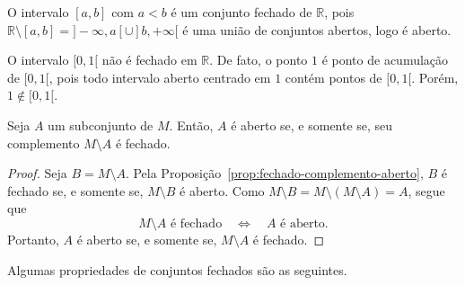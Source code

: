 \begin{example}
    O intervalo $[a, b]$ com $a<b$ é um conjunto fechado de $\mathbb R$, pois $\mathbb R\setminus [a, b] = ]-\infty, a[ \cup ]b, +\infty[$ é uma união de conjuntos abertos, logo é aberto.
\end{example}

\begin{example}
    O intervalo $[0,1[$ não é fechado em $\mathbb R$.
    De fato, o ponto $1$ é ponto de acumulação de $[0,1[$, pois todo intervalo aberto centrado em $1$ contém pontos de $[0,1[$.
    Porém, $1\notin [0,1[$.
\end{example}

\begin{corollary}
    Seja $A$ um subconjunto de $M$.
    Então, $A$ é aberto se, e somente se, seu complemento $M\setminus A$ é fechado.
\end{corollary}
\begin{proof}
    Seja $B=M\setminus A$.
    Pela Proposição~\ref{prop:fechado-complemento-aberto}, $B$ é fechado se, e somente se, $M\setminus B$ é aberto.
    Como $M\setminus B=M\setminus(M\setminus A)=A$, segue que
    \[
        M\setminus A \text{ é fechado}
        \quad\Longleftrightarrow\quad
        A \text{ é aberto}.
    \]
    Portanto, $A$ é aberto se, e somente se, $M\setminus A$ é fechado.
\end{proof}

Algumas propriedades de conjuntos fechados são as seguintes.

